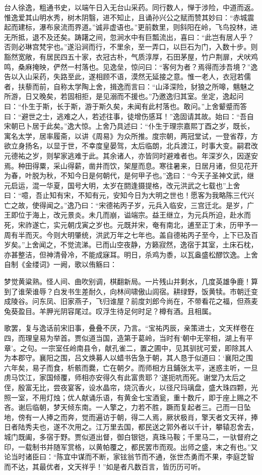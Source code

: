 \documentclass[a4paper,12pt,UTF8,twoside]{ctexbook}
\begin{document}
台人徐逸，粗通书史，以端午日入无台山采药。同行数人，惮于涉险，中道而返。惟逸爱其山明水秀，树木阴翳，进不知止，且诵孙兴公之赋而赞其妙曰：“赤城震起而建标，瀑布泉流而界道。”诚非虚语也。”更前数里，则斜阳在岭，飞鸟投林，进无所抵，退不及还矣。踌躇之间，忽涧水中有巨瓢流出，喜曰：“此岂有居人乎？否则必琳宫梵宇也。”遂沿涧而行，不里余，至一弄口，以巨石为门，入数十步。则豁然宽敞，有居民四五十家，衣冠古朴，气质淳厚，石田茅屋，竹户荆扉，犬吠鸡鸣，桑麻掩映，俨然一村落也。见逸垒，惊问曰：“客何为者？焉得而涉吾境？”逸告以入山采药，失路至此，遂相顾不语，漠然无延接之意。惟一老人，衣冠若儒者，扶藜而前，自称太学陶上舍，揖逸而言曰：“山泽深险，豺狼之所嗥，魑魅之所游，日又晚矣，若固相拒，是见溺而不援也。”乃邀逸归其室。坐定，逸起问曰：“仆生于斯，长于斯，游于斯久矣，未闻有此村落也。敢问。”上舍颦蹙而答曰：“避世之士，逃难之人，若述往事，徒增伤感耳！”逸固请其故。始曰：“吾自宋朝已卜居于此矣。”逸大惊。上舍乃具述曰：“仆生于理宗嘉熙丁酉之岁，既长，寓名太学，居率履斋，以讲《周易》为众所推。度宗朝，两冠堂试，一登省荐，方欲立身扬名，以显于世，不幸度皇晏驾，太后临朗，北兵渡江，时事大变。嗣君改元德祐之岁，则挈家逃难于此。其余诸人，亦皆同时避难者也。年深岁久，因遂安焉。种田得粟，采山得薪，凿井而饮，架屋而息。寒往暑来，日居月诸，但见花开为春，叶脱为秋，不知今日是何朝代，是何甲子也。”逸曰：“今天子圣神文武，继元启运，混一华夏，国号大明，太岁在閼逢摄提格，改元洪武之七载也”上舍曰：“噫，吾止知有宋，不知有元，安知今日为大明之世也！愿客为我略陈三代兴亡之故，使得闻之。”逸乃曰：“宋德祐丙子岁，元兵入临安，三宫迁北。是岁，广王即位于海上，改元景炎。未几而崩，谥端宗。益王继立，为元兵所迫，赴水而死，宋祚遂亡，实元朝戊寅之岁也。元既并宋，奄有南北，逋至正丁未，历甲予一周有半而灭。今则大明肇统，洪武万年之七年也。盖自德祐丙子至今，上下已及百岁矣。”上舍闻之，不觉流涕。已而山空夜静，方籁寂然，逸宿于其室，土床石枕，亦甚整洁，但神清骨冷，不能成寐耳。明日，杀鸡为黍，以瓦盎盛松醪饮逸。上舍自制《金缕词》一阙，歌以侑觞曰：

梦觉黄粱熟。怪人间、曲吹别调，棋翻新局。一片残山并剩水，几度英雄争鹿！算到了谁荣谁辱？白发书生差耐久，向林间啸傲山闾宿。耕绿野，饭黄犊。市朝迁变成陵谷。问东凤、旧家燕子，飞归谁屋？前度刘郎今尚在，不带看花之福，但燕麦兔葵盈目。羊胛光阴容尾过。叹浮生待足何时足？樽有酒。且相属。

歌罢，复与逸话前宋旧事，叠叠不厌，乃言。“宝祐丙辰，亲策进士，文天样卷在四，而理皇易为举首。贾似道当国，造第于葛岭，当时有‘朝中无宰相，湖上有平章’。之句。一宗室任岭南县令，献孔雀二，置之圃中，见其驯扰可爱，即除其人为本郡守。襄阳之围，吕文焕募人以蜡书告急于朝，其人恳于似道曰：‘襄阳之围六年矣，易子而食，析骸而爨，亡在朝夕。而师相方且鋪张太平，迷惑主听，一旦虏马饮江，家国倾覆，师相亦安得久有此富贵耶？’遂扼吭而死。谢堂乃太后之侄，殷富无比，尝夜宴客，设水晶帘，烧沉香火，以径尺玛璃盘，盛大珠四颗，光照一室，不用灯烛；优人献诵乐语，有黄金七宝酒瓮，重十数斤，即于座上赐之不吝。谢后临朝，梦天倾东南。一人擎之，力若不胜，蹶而复起者三。己而一日坠地，傍有一人捧之而奔，觉而遍访于朝，得二人焉，厥状极肖，擎天者文天祥，捧日者陆秀夫也，遂不次用之。江万里去国，都民送之郭外者以千计，攀辕忍舍去，城门既阖，多宿于野。贾似道出督，御白银铠，真珠马鞍；千里马二，一驮督府之印，一载制书并随军赏格，以黄帕覆之，都民罢市而观。出师之盛，末之有也。”又论当时诸臣曰：“陈宜中谋而不断，家铉翁节而不通，张世杰勇而不果，李庭芝智而不达，其最优者，文天祥乎！”如是者凡数百言，皆历历可听。
\end{document}
